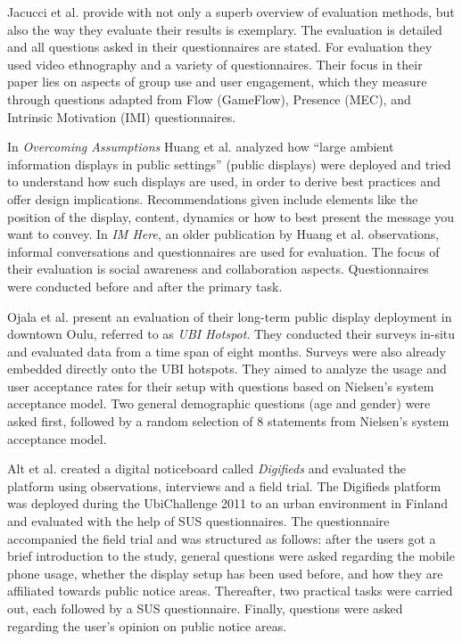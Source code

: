 	Jacucci et al. provide with \cite{jacucci2010worldsofinformation}not only a superb overview of evaluation methods, but also the way they evaluate their results is exemplary. The evaluation is detailed and all questions asked in their questionnaires are stated. For evaluation they used video ethnography and a variety of questionnaires. Their focus in their paper lies on aspects of group use and user engagement, which they measure through questions adapted from Flow (GameFlow), Presence (MEC), and Intrinsic Motivation (IMI) questionnaires.

	In \textit{Overcoming Assumptions} Huang et al. \cite{huang2008overcoming} analyzed how ``large ambient information displays in public settings'' (public displays) were deployed and tried to understand how such displays are used, in order to derive best practices and offer design implications. Recommendations given include elements like the position of the display, content, dynamics or how to best present the message you want to convey.
	In \textit{IM Here}, an older publication by Huang et al. \cite{Huang2004} observations, informal conversations and questionnaires are used for evaluation. The focus of their evaluation is social awareness and collaboration aspects. Questionnaires were conducted before and after the primary task.

	Ojala et al. \cite{ojala2010ubi} present an evaluation of their long-term public display deployment in downtown Oulu, referred to as \textit{UBI Hotspot}. They conducted their surveys in-situ and evaluated data from a time span of eight months. Surveys were also already embedded directly onto the UBI hotspots. They aimed to analyze the usage and user acceptance rates for their setup with questions based on Nielsen's system acceptance model. Two general demographic questions (age and gender) were asked first, followed by a random selection of 8 statements from Nielsen's system acceptance model.


	Alt et al. \cite{alt2011digifieds} created a digital noticeboard called \textit{Digifieds} and evaluated the platform using observations, interviews and a field trial. The Digifieds platform was deployed during the UbiChallenge 2011 to an urban environment in Finland and evaluated with the help of SUS questionnaires. The questionnaire accompanied the field trial and was structured as follows: after the users got a brief introduction to the study, general questions were asked regarding the mobile phone usage, whether the display setup has been used before, and how they are affiliated towards public notice areas. Thereafter, two practical tasks were carried out, each followed by a SUS questionnaire. Finally, questions were asked regarding the user's opinion on public notice areas. 



